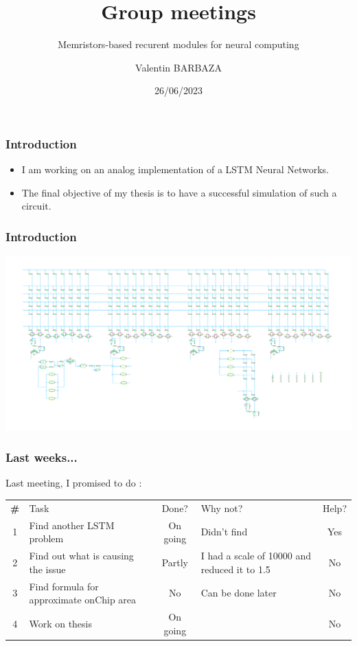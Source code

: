 \documentclass[table]{beamer}
\title{Group meetings}
\subtitle{Memristors-based recurent modules for neural computing}
\author[V. BARBAZA]{Valentin BARBAZA}
\date{26/06/2023}
\begin{document}
  \frame{\titlepage}


  \begin{frame}
    \frametitle{Introduction}

    \begin{itemize}
        \color{text}
      \item I am working on an analog implementation of a LSTM Neural Networks.
      \item The final objective of my thesis is to have a successful simulation of such a circuit.
    \end{itemize}

  \end{frame}


  \begin{frame}
    \frametitle{Introduction}
    \centering\includegraphics[width=\textwidth]{lstm/lstm-np}
  \end{frame}

  \begin{frame}
    \frametitle{Last weeks...}

    Last meeting, I promised to do :

    \centering
    \begin{tabular}{c p{} c p{} c}
      \rowcolor{firstRow}
      \color{white}\textbf{\#} & \centering\color{white}Task & \color{white}Done? & \color{white}Why not? & \color{white}Help? \\
      1 & Find another LSTM problem & On going & Didn't find & Yes\\
      2 & Find out what is causing the issue & Partly & I had a scale of 10000 and reduced it to 1.5 & No\\
      3 & Find formula for approximate onChip area & No & Can be done later & No\\
      4 & Work on thesis & On going & & No\\
    \end{tabular}

  \end{frame}
\end{document}
